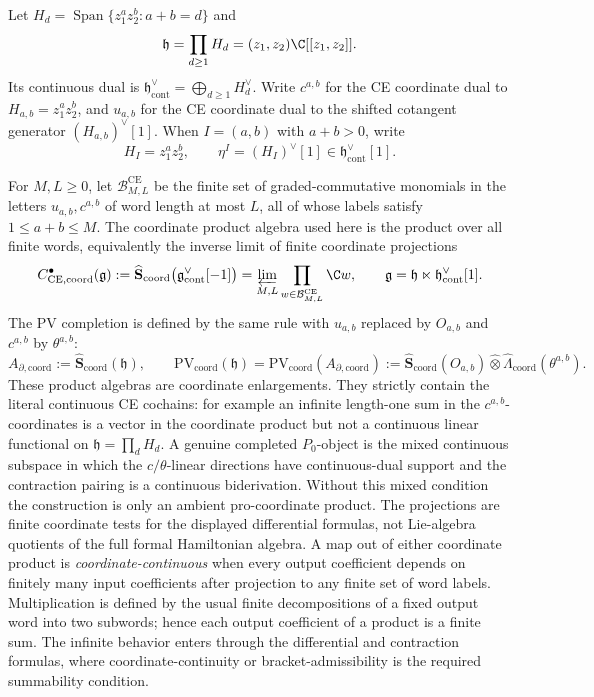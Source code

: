 \begin{defn}\label{defn:formal-disk-ce-pv-completion}
  Let \(H_d=\operatorname{Span}\{z_1^az_2^b:a+b=d\}\) and
  \[
    \mathfrak h=\prod_{d\geq1}H_d=(z_1,z_2)\C[[z_1,z_2]] .
  \]
  Its continuous dual is
  \(\mathfrak h^\vee_{\mathrm{cont}}=\bigoplus_{d\geq1}H_d^\vee\).
  Write \(c^{a,b}\) for the CE coordinate dual to
  \(H_{a,b}=z_1^az_2^b\), and \(u_{a,b}\) for the CE coordinate dual to
  the shifted cotangent generator \((H_{a,b})^\vee[1]\).  When
  \(I=(a,b)\) with \(a+b>0\), write
  \[
    H_I=z_1^az_2^b,\qquad
    \eta^I=(H_I)^\vee[1]\in\mathfrak h^\vee_{\mathrm{cont}}[1].
  \]

  For \(M,L\geq0\), let \(\mathcal B_{M,L}^{\mathrm{CE}}\) be the
  finite set of graded-commutative monomials in the letters
  \(u_{a,b},c^{a,b}\) of word length at most \(L\), all of whose labels
  satisfy \(1\leq a+b\leq M\).  The coordinate product algebra used here
  is the product over all finite words, equivalently the inverse limit of
  finite coordinate projections
  \[
    C^\bullet_{\mathrm{CE},\mathrm{coord}}(\mathfrak g)
    :=
    \widehat{\mathbf S}_{\mathrm{coord}}
    \bigl(\mathfrak g^\vee_{\mathrm{cont}}[-1]\bigr)
    =
    \varprojlim_{M,L}\prod_{w\in\mathcal B_{M,L}^{\mathrm{CE}}}\C w ,
    \qquad
    \mathfrak g=\mathfrak h\ltimes
      \mathfrak h^\vee_{\mathrm{cont}}[1].
  \]
	  The PV completion is defined by the same rule with \(u_{a,b}\)
	  replaced by \(O_{a,b}\) and \(c^{a,b}\) by \(\theta^{a,b}\):
	  \[
	    A_{\partial,\mathrm{coord}}
	    :=\widehat{\mathbf S}_{\mathrm{coord}}(\mathfrak h),
	    \qquad
	    \mathrm{PV}_{\mathrm{coord}}(\mathfrak h)
	    =
	    \mathrm{PV}_{\mathrm{coord}}(A_{\partial,\mathrm{coord}})
	    :=
	    \widehat{\mathbf S}_{\mathrm{coord}}(O_{a,b})
	    \widehat\otimes
    \widehat\Lambda_{\mathrm{coord}}(\theta^{a,b}).
  \]
	  These product algebras are coordinate enlargements.  They strictly
  contain the literal continuous CE cochains: for example an infinite
  length-one sum in the \(c^{a,b}\)-coordinates is a vector in the
  coordinate product but not a continuous linear functional on
  \(\mathfrak h=\prod_d H_d\).  A genuine completed \(P_0\)-object is the
  mixed continuous subspace in which the \(c/\theta\)-linear directions
  have continuous-dual support and the contraction pairing is a
  continuous biderivation.  Without this mixed condition the construction
	  is only an ambient pro-coordinate product.  The projections are finite
	  coordinate tests for the displayed differential formulas, not
	  Lie-algebra quotients of the full formal Hamiltonian algebra.
  A map out of either coordinate product is \emph{coordinate-continuous}
  when every output coefficient depends on finitely many input
  coefficients after projection to any finite set of word labels.
  Multiplication is defined by the usual finite decompositions of a fixed
  output word into two subwords; hence each output coefficient of a
  product is a finite sum.  The infinite behavior enters through the
  differential and contraction formulas, where coordinate-continuity or
  bracket-admissibility is the required summability condition.
		\end{defn}

